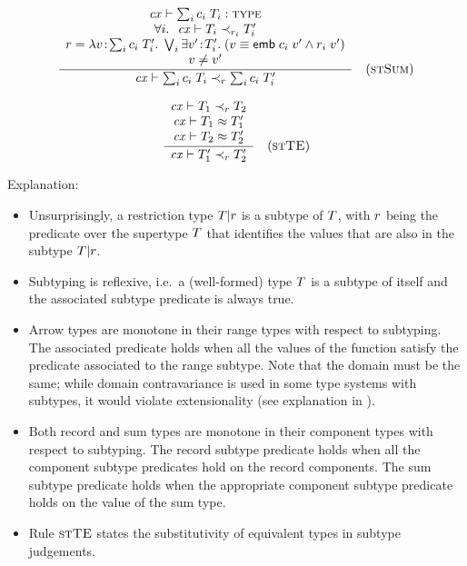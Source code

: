 \[
\frac{\begin{array}{c}\mathit{cx}\vdash\sum_{i}c_i\;T_i:\textsc{type}\\\forall i.\ \ \mathit{cx}\vdash T_i\prec_{r_i}T_i'\\r=\lambda v\!:\!\sum_{i}c_i\;T_i'.\;\bigvee_{i}\exists v'\!:\!T_i'.\;(v\equiv\mathsf{emb}\;{c_i}\;v'\wedge r_i\;v')\\v\neq v'\end{array}}{\mathit{cx}\vdash\sum_{i}c_i\;T_i\prec_{r}\sum_{i}c_i\;T_i'}\quad\mbox{(\textsc{stSum})}
\]


\[
\frac{\begin{array}{c}\mathit{cx}\vdash T_1\prec_{r}T_2\\\mathit{cx}\vdash T_1\approx T_1'\\\mathit{cx}\vdash T_2\approx T_2'\end{array}}{\mathit{cx}\vdash T_1'\prec_{r}T_2'}\quad\mbox{(\textsc{stTE})}
\]

Explanation:
\begin{itemize}
\item
Unsurprisingly, a restriction type $T|r$ is a subtype of $T$, with
$r$ being the predicate over the supertype $T$ that identifies the
values that are also in the subtype $T|r$.
\item
Subtyping is reflexive, i.e.\ a (well-formed) type $T$ is a subtype of
itself and the associated subtype predicate is always true.
\item
Arrow types are monotone in their range types with respect to subtyping. The
associated predicate holds when all the values of the function satisfy the
predicate associated to the range subtype. Note that the domain must be the
same; while domain contravariance is used in some type systems with subtypes,
it would violate extensionality (see explanation in \cite{pvs-seman}).
\item
Both record and sum types are monotone in their component types with respect
to subtyping. The record subtype predicate holds when all the component
subtype predicates hold on the record components. The sum subtype predicate
holds when the appropriate component subtype predicate holds on the value of
the sum type.
\item
Rule $\textsc{stTE}$ states the substitutivity of equivalent types in subtype
judgements.
\end{itemize}

